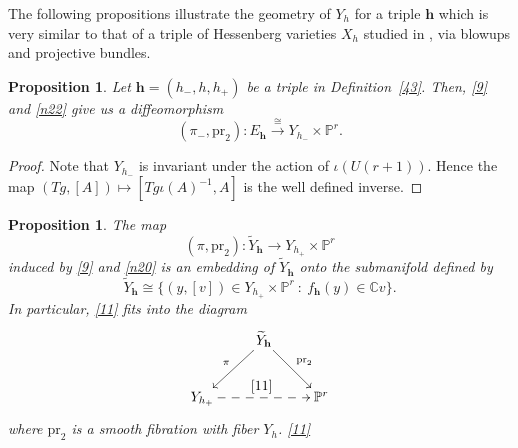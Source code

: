 \documentclass[11pt]{article}
\newtheorem{proposition}[theo]{Proposition}
\theoremstyle{definition}
\numberwithin{equation}{section}
\numberwithin{equation}{section}
\newcommand{\C}{\mathbb{C}}
\newcommand{\PP}{\mathbb{P}}
\newcommand\tY{{\widetilde{Y}}}
\newcommand\lra{\longrightarrow }
\newcommand\beq{\begin{equation}}
\newcommand\eeq{\end{equation}}
\newcommand\pr{\mathrm{pr}}
\newcommand\bh{\mathbf{h}}
\begin{document}
The following propositions illustrate the geometry of  $Y_h$ for a triple $\bh$ which is very similar to that of a triple of Hessenberg varieties $X_h$ studied in \cite[\S3.3]{KL}, via blowups and projective bundles. 

\begin{proposition}\label{40}
	Let $\bh=(h_-,h,h_+)$ be a triple in Definition~\ref{43}. Then, \eqref{9} and \eqref{n22} give us a diffeomorphism
	\beq \label{44} 
		(\pi_-,\pr_2):E_\bh \xrightarrow{~\cong~} Y_{h_-}\times \PP^r.\eeq
\end{proposition}
\begin{proof}
	Note that $Y_{h_-}$ is invariant under the action of $\iota(U(r+1))$. Hence the map $(Tg,[A])\mapsto [Tg\iota (A)^{-1},A]$ is the well defined inverse.
	\end{proof}
\begin{proposition} \label{38}
	The map
		\beq \label{41} (\pi,\pr_2):\tY_\bh \lra  Y_{h_+}\times \PP^r\eeq
		induced by \eqref{9} and \eqref{n20} is an embedding of $\tY_\bh$ onto the submanifold defined by 
		\beq \label{42} \tY_\bh \cong \{(y,[v])\in Y_{h_+}\times \PP^r~:~ f_{\bh}(y) \in \C v\}.\eeq
		In particular, \eqref{11} fits into the diagram   
		\beq \label{37}  
		\xymatrix{&\tY_\bh \ar[ld]_-{\pi}\ar[rd]^-{\pr_2}& \\ Y_{h_+}\ar@{-->}[rr]^{\eqref{11}}&&\PP^r}\eeq
		where $\pr_2$ is a smooth fibration with fiber $Y_h$.
		\eqref{11}
\end{proposition}
\end{document}

